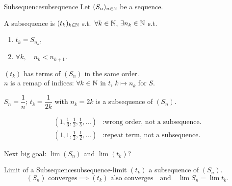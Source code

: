 \begin{definition}{Subsequence}{subsequence}
  Let $(S_n)_{n\in\mathbb{N}}$ be a sequence.

  A subsequence is $(t_k)_{k\in\mathbb{N}}$ s.t.\ $\forall k\in\mathbb{N}$,
  $\exists n_k\in\mathbb{N}$ s.t.
  \begin{enumerate}[label=(\roman*)]
    \item $t_k=S_{n_k}$,
    \item $\forall k,\quad n_k<n_{k+1}$.
  \end{enumerate}
\end{definition}

\begin{thinking}[Intuition]
  $(t_k)$ has terms of $(S_n)$ in the same order.\\
  $n$ is a remap of indices: $\forall k\in\mathbb{N}$ in $t$, $k\mapsto n_k$ for $S$.
\end{thinking}

\begin{example}
  $S_n=\dfrac1n$; $t_k=\dfrac1{2k}$ with $n_k=2k$ is a subsequence of $(S_n)$.
  \begin{center}
  \end{center}
  \begin{align*}
    \left(1,\frac13,\frac12,\frac15,\ldots\right)
     & : \text{wrong order, not a subsequence.} \\
    \left(1,1,\frac12,\frac12,\ldots\right)
     & : \text{repeat term, not a subsequence.}
  \end{align*}
\end{example}

Next big goal: $\lim(S_n)$ and $\lim(t_k)$?

\begin{theorem}{Limit of a Subsequence}{subsequence-limit}
  $(t_k)$ a subsequence of $(S_n)$.
  \[
    (S_n)\text{ converges}\implies(t_k)\text{ also converges}
    \quad\text{and}\quad\lim S_n=\lim t_k.
  \]
\end{theorem}

